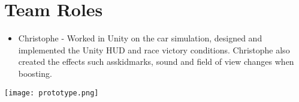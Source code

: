 \iffalse
Since we using git for our version control, and Github as our host for the project, we made use of Github's in-built issue tracking system. (Currently we use Trello to flag up issues, sometimes breaking our task board story-system by making a new card just for the issue. Using a dedicated system could help organise what problems we are having, in particular which issues are preventing further work from being completed. However, Github's 'Issues' feature isn't just restricted to bug fixes; it can be used for enhancements and keeping track of who is working on what, so it might be worth using this as an alternative, or in addition to Trello.) (Did we even use this?)
\fi

\section{Team Roles}
\begin{itemize}
  \item Christophe - Worked in Unity on the car simulation, designed and implemented the Unity HUD and race victory conditions. Christophe also created the effects such asskidmarks, sound and field of view changes when boosting.
\end{itemize}

\begin{center}
\texttt{[image: prototype.png]}
\end{center}
